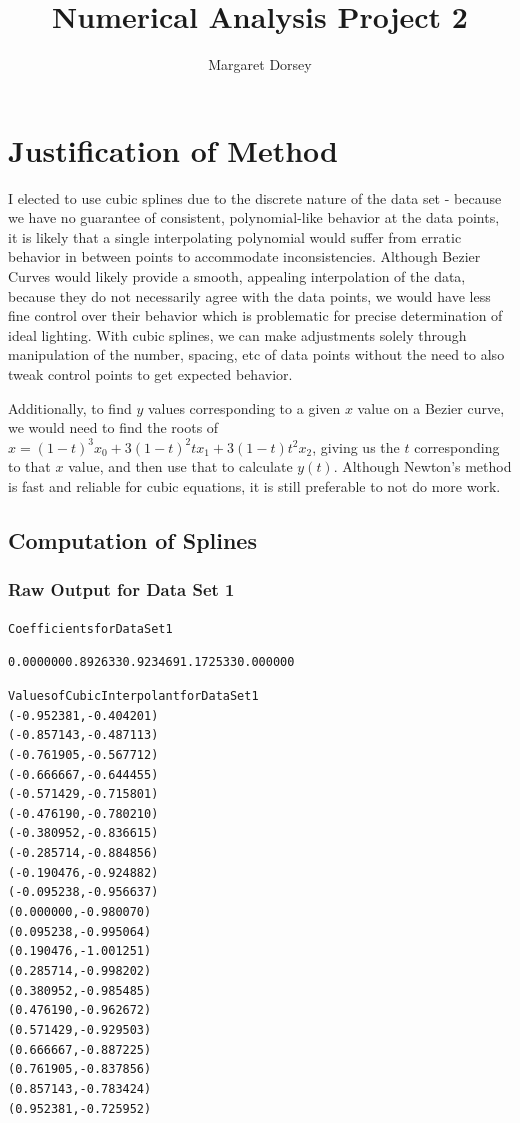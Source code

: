 \documentclass[11pt]{article} %
\title{Numerical Analysis Project 2}
\author{Margaret Dorsey}
\begin{document}
\maketitle

\section*{Justification of Method}
	I elected to use cubic splines due to the discrete nature of the data set - because we have no guarantee of consistent, polynomial-like behavior at the data points, it is likely that a single interpolating polynomial would suffer from erratic behavior in between points to accommodate inconsistencies. Although Bezier Curves would likely provide a smooth, appealing interpolation of the data, because they do not necessarily agree with the data points, we would have less fine control over their behavior which is problematic for precise determination of ideal lighting. With  cubic splines, we can make adjustments solely through manipulation of the number, spacing, etc of data points without the need to also tweak control points to get expected behavior.
\par Additionally, to find $y$ values corresponding to a given $x$ value on a Bezier curve, we would need to find the roots of $x = (1-t)^3x_0 + 3(1-t)^2tx_1 + 3(1-t)t^2x_2$, giving us the $t$ corresponding to that $x$ value, and then use that to calculate $y(t)$. Although Newton's method is fast and reliable for cubic equations, it is still preferable to not do more work.

\subsection*{Computation of Splines}
\subsubsection*{Raw Output for Data Set 1}
\begin{alltt}
Coefficients for Data Set 1

0.000000	0.892633	0.923469	1.172533	0.000000	

 Values of Cubic Interpolant for Data Set 1
(-0.952381, -0.404201)
(-0.857143, -0.487113)
(-0.761905, -0.567712)
(-0.666667, -0.644455)
(-0.571429, -0.715801)
(-0.476190, -0.780210)
(-0.380952, -0.836615)
(-0.285714, -0.884856)
(-0.190476, -0.924882)
(-0.095238, -0.956637)
(0.000000, -0.980070)
(0.095238, -0.995064)
(0.190476, -1.001251)
(0.285714, -0.998202)
(0.380952, -0.985485)
(0.476190, -0.962672)
(0.571429, -0.929503)
(0.666667, -0.887225)
(0.761905, -0.837856)
(0.857143, -0.783424)
(0.952381, -0.725952)
\end{alltt}
\end{document}
